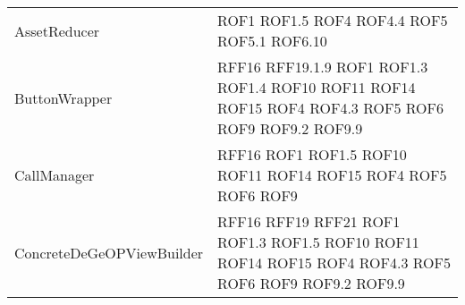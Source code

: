 \begin{longtable}{p{5cm}!{\VRule[1pt]}p{2.5cm}}
	AssetReducer & ROF1 \newline ROF1.5 \newline ROF4 \newline ROF4.4 \newline ROF5 \newline ROF5.1 \newline ROF6.10\\
	ButtonWrapper & RFF16 \newline RFF19.1.9 \newline ROF1 \newline ROF1.3 \newline ROF1.4 \newline ROF10 \newline ROF11 \newline ROF14 \newline ROF15 \newline ROF4 \newline ROF4.3 \newline ROF5 \newline ROF6 \newline ROF9 \newline ROF9.2 \newline ROF9.9\\
	CallManager & RFF16 \newline ROF1 \newline ROF1.5 \newline ROF10 \newline ROF11 \newline ROF14 \newline ROF15 \newline ROF4 \newline ROF5 \newline ROF6 \newline ROF9\\
	ConcreteDeGeOPViewBuilder & RFF16 \newline RFF19 \newline RFF21 \newline ROF1 \newline ROF1.3 \newline ROF1.5 \newline ROF10 \newline ROF11 \newline ROF14 \newline ROF15 \newline ROF4 \newline ROF4.3 \newline ROF5 \newline ROF6 \newline ROF9 \newline ROF9.2 \newline ROF9.9\\

\end{longtable}
